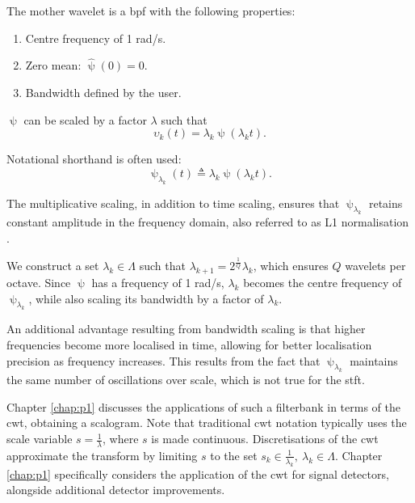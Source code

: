 The mother wavelet is a \ac{bpf} with the following properties:
\begin{enumerate}
    \item Centre frequency of 1 rad/s.
    \item Zero mean: $\hat{\uppsi}(0) = 0$.
    \item Bandwidth defined by the user.
\end{enumerate}


$\uppsi$ can be scaled by a factor $\lambda$ such that
\begin{equation}
    \upsilon_k(t) = \lambda_k \uppsi(\lambda_k t).
\end{equation}

Notational shorthand is often used: 
\begin{equation}
    \uppsi_{\lambda_k}(t) \triangleq \lambda_k \uppsi(\lambda_k t).
\end{equation}

The multiplicative scaling, in addition to time scaling, ensures that $\uppsi_{\lambda_k}$ retains constant amplitude in the frequency domain, also referred to as L1 normalisation \cite{waveletbook}.

We construct a set $\lambda_k \in \Lambda$ such that $\lambda_{k+1} = 2^\frac{1}{Q}\lambda_{k}$, which ensures $Q$ wavelets per octave. Since $\uppsi$ has a frequency of 1 rad/s, $\lambda_k$ becomes the centre frequency of $\uppsi_{\lambda_k}$, while also scaling its bandwidth by a factor of $\lambda_k$. 

An additional advantage resulting from bandwidth scaling is that higher frequencies become more localised in time, allowing for better localisation precision as frequency increases. This results from the fact that $\uppsi_{\lambda_k}$ maintains the same number of oscillations over scale, which is not true for the \ac{stft}.

Chapter \ref{chap:p1} discusses the applications of such a filterbank in terms of the \ac{cwt}, obtaining a scalogram. Note that traditional \ac{cwt} notation typically uses the scale variable $s = \frac{1}{\lambda}$, where $s$ is made continuous. Discretisations of the \ac{cwt} approximate the transform by limiting $s$ to the set $s_k \in \frac{1}{\lambda_k}, \ \lambda_k \in \Lambda$. Chapter \ref{chap:p1} specifically considers the application of the \ac{cwt} for signal detectors, alongside additional detector improvements.

